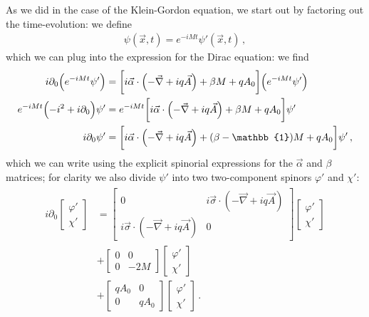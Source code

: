 \documentclass[main.tex]{subfiles}
\begin{document}
As we did in the case of the Klein-Gordon equation, we start out by factoring out the time-evolution: we define 
%
\begin{align}
\psi (\vec{x}, t) = e^{-i M t} \psi' (\vec{x}, t)
\,,
\end{align}
%
which we can plug into the expression for the Dirac equation: we find 
%
\begin{align}
i \partial_0 \qty(e^{-iMt} \psi ') &= \qty[i \vec{\alpha} \cdot \qty(- \vec{\nabla} + i q \vec{A}) + \beta M + q A_0 ] \qty(e^{-iMt} \psi')  \\
e^{-iMt } \qty(- i^2 + i \partial_0 ) \psi' &=
e^{-iMt} \qty[i \vec{\alpha} \cdot \qty(- \vec{\nabla} + i q \vec{A}) + \beta M + q A_0 ] \psi'  \\
i \partial_0 \psi' &= \qty[i \vec{\alpha} \cdot \qty(- \vec{\nabla} + i q \vec{A}) + (\beta - \mathbb{1}) M + q A_0 ] \psi'
\,,
\end{align}
%
which we can write using the explicit spinorial expressions for the \(\vec{\alpha}\) and \(\beta \) matrices; for clarity we also divide \(\psi '\) into two two-component spinors \(\varphi'\) and \(\chi '\):
%
\begin{align}
\begin{split}
i \partial_0 
\left[\begin{array}{c}
\varphi' \\ 
\chi '
\end{array}\right]
 &= 
\left[\begin{array}{cc}
0 & i \vec{\sigma} \cdot (-\vec{\nabla} + i q \vec{A})  \\ 
i \vec{\sigma} \cdot (-\vec{\nabla} + i q \vec{A}) & 0
\end{array}\right]
\left[\begin{array}{c}
    \varphi' \\ 
    \chi '
\end{array}\right] \\
&
+ \left[\begin{array}{cc}
0 & 0 \\ 
0 & -2M
\end{array}\right] \left[\begin{array}{c}
\varphi' \\ 
\chi '
\end{array}\right]
\\
&
+ \left[\begin{array}{cc}
qA_0  & 0 \\ 
0 & q A_0 
\end{array}\right] \left[\begin{array}{c}
\varphi' \\ 
\chi '
\end{array}\right]
\,.
\end{split}
\end{align}
\end{document}
